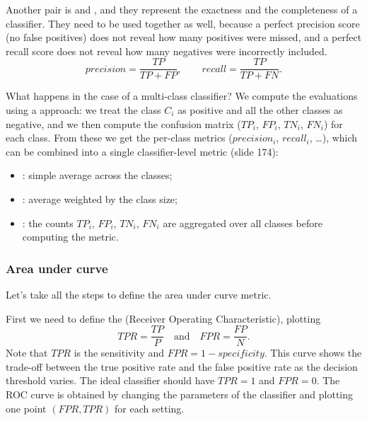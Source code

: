 Another pair is  and , and they represent the exactness and the completeness of a classifier. They need to be used together as well, because a perfect precision score (no false positives) does not reveal how many positives were missed, and a perfect recall score does not reveal how many negatives were incorrectly included.
\[
  precision = \frac{TP}{TP + FP}, \qquad recall = \frac{TP}{TP + FN}.
\]

What happens in the case of a multi-class classifier? We compute the evaluations using a  approach: we treat the class $C_i$ as positive and all the other classes as negative, and we then compute the confusion matrix ($TP_i$, $FP_i$, $TN_i$, $FN_i$) for each class. From these we get the per-class metrics ($precision_i$, $recall_i$, \dots), which can be combined into a single classifier-level metric (slide 174):
\begin{itemize}
  \item {}: simple average across the classes;
  \item {}: average weighted by the class size;
  \item {}: the counts $TP_i$, $FP_i$, $TN_i$, $FN_i$ are aggregated over all classes before computing the metric.
\end{itemize}

\subsubsection{Area under curve}
Let's take all the steps to define the area under curve metric.

First we need to define the  (Receiver Operating Characteristic), plotting
\[
  TPR = \frac{TP}{P} \quad\text{and}\quad FPR = \frac{FP}{N}.
\]
Note that $TPR$ is the sensitivity and $FPR = 1 - specificity$. This curve shows the trade-off between the true positive rate and the false positive rate as the decision threshold varies. The ideal classifier should have $TPR = 1$ and $FPR = 0$. The ROC curve is obtained by changing the parameters of the classifier and plotting one point $(FPR, TPR)$ for each setting.

\begin{center}
\end{center}

